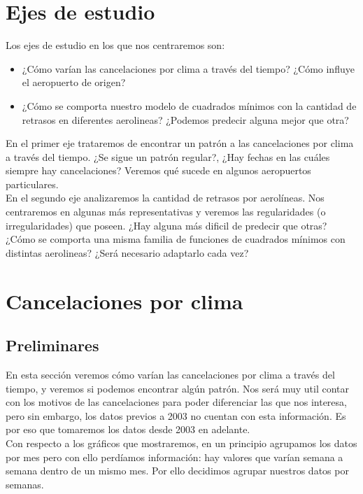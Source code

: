\section{Ejes de estudio}

Los ejes de estudio en los que nos centraremos son:
\begin{itemize}
    \item ¿Cómo varían las cancelaciones por clima a través del tiempo? ¿Cómo influye el aeropuerto de origen?
    \item ¿Cómo se comporta nuestro modelo de cuadrados mínimos con la cantidad de retrasos en diferentes aerolineas? ¿Podemos predecir alguna mejor que otra?
\end{itemize}

En el primer eje trataremos de encontrar un patrón a las cancelaciones por clima a través del tiempo. ¿Se sigue un patrón regular?, ¿Hay fechas en las cuáles siempre hay cancelaciones? Veremos qué sucede en algunos aeropuertos particulares. \\

En el segundo eje analizaremos la cantidad de retrasos por aerolíneas. Nos centraremos en algunas más representativas y veremos las regularidades (o irregularidades) que poseen. ¿Hay alguna más dificil de predecir que otras? ¿Cómo se comporta una misma familia de funciones de cuadrados mínimos con distintas aerolineas? ¿Será necesario adaptarlo cada vez? \\

\section{Cancelaciones por clima}

\subsection{Preliminares}

En esta sección veremos cómo varían las cancelaciones por clima a través del tiempo, y veremos si podemos encontrar algún patrón. Nos será muy util contar con los motivos de las cancelaciones para poder diferenciar las que nos interesa, pero sin embargo, los datos previos a 2003 no cuentan con esta información. Es por eso que tomaremos los datos desde 2003 en adelante. \\

Con respecto a los gráficos que mostraremos, en un principio agrupamos los datos por mes pero con ello perdíamos información: hay valores que varían semana a semana dentro de un mismo mes. Por ello decidimos agrupar nuestros datos por semanas. \\


